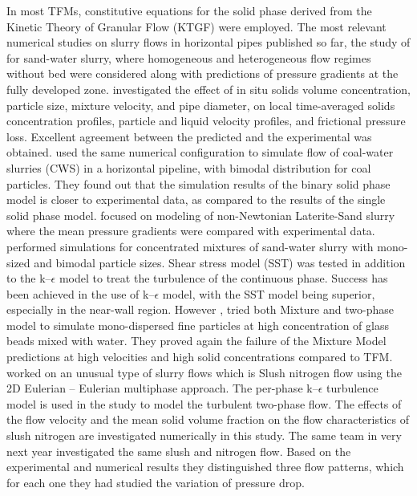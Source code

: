 \documentclass[11pt]{report}
\begin{document}
%
In most TFMs, constitutive equations for the solid phase derived from the Kinetic Theory of Granular Flow (KTGF) were employed.
%
The most relevant numerical studies on slurry flows in horizontal pipes published so far, the study of \citet{herna2008cfd} for sand-water slurry, where homogeneous and heterogeneous flow regimes without bed were considered along with predictions of pressure gradients at the fully developed zone.
%
\citet{Ekambara-2009} investigated the effect of in situ solids volume concentration, particle size, mixture velocity, and pipe diameter, on local time-averaged solids concentration profiles, particle and liquid velocity profiles, and frictional pressure loss.
%
Excellent agreement between the predicted and the experimental was obtained.
%
\citet{Liangyon-2009} used the same numerical configuration to simulate flow of coal-water slurries (CWS) in a horizontal pipeline, with bimodal distribution for coal particles.
%
They found out that the simulation results of the binary solid phase model is closer to experimental data, as compared to the results of the single solid phase model.
%
\citet{bossio2009eulerian} focused on modeling of non-Newtonian Laterite-Sand slurry where the mean pressure gradients were compared with experimental data.
%
\citet{antaya2012modelling}  performed simulations for concentrated mixtures of sand-water slurry with mono-sized and bimodal particle sizes.
%
Shear stress model (SST) was tested in addition to the k–$\epsilon$ model to treat the turbulence of the continuous  phase. Success has been achieved in the use of k–$\epsilon$ model,  with the SST model being superior, especially in the near-wall region.
%
However \citet{D.R-2012}, tried both  Mixture and  two-phase model to simulate mono-dispersed fine particles at high concentration of glass beads mixed with water.
%
They proved again the failure of the Mixture Model predictions at high velocities and high solid concentrations compared to TFM.
%
\cite{Y.Y-2012} worked on an unusual type of slurry flows which is Slush nitrogen flow using the 2D Eulerian – Eulerian multiphase approach.
%
The per-phase k–$\epsilon$ turbulence model is used in the study to model the turbulent two-phase flow.
%
The effects of the flow velocity and the mean solid volume fraction on the flow characteristics of slush nitrogen are investigated numerically in this study.
%
The same team in very next year \citet{Jiang-2013} investigated the same slush and nitrogen flow. Based on the experimental and numerical results they distinguished three flow patterns, which for each one they had studied the variation of pressure drop.
\end{document}
